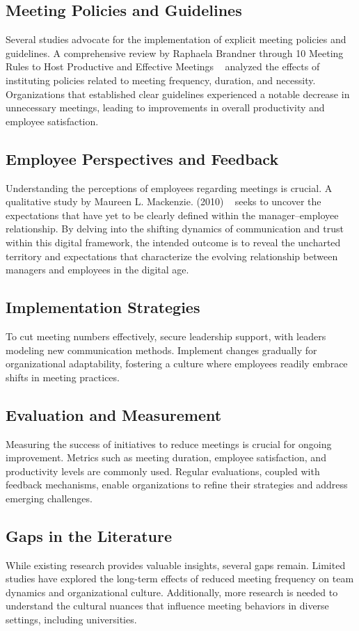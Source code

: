 \subsection{Meeting Policies and Guidelines}
Several studies advocate for the implementation of explicit meeting policies and guidelines. A comprehensive review by Raphaela Brandner through 10 Meeting Rules to Host Productive and Effective Meetings ~\cite{15} analyzed the effects of instituting policies related to meeting frequency, duration, and necessity. Organizations that established clear guidelines experienced a notable decrease in unnecessary meetings, leading to improvements in overall productivity and employee satisfaction.

\subsection{Employee Perspectives and Feedback}
Understanding the perceptions of employees regarding meetings is crucial. A qualitative study by Maureen L. Mackenzie. (2010) ~\cite{16} seeks to uncover the expectations that have yet to be clearly defined within the manager–employee relationship. By delving into the shifting dynamics of communication and trust within this digital framework, the intended outcome is to reveal the uncharted territory and expectations that characterize the evolving relationship between managers and employees in the digital age.

\subsection{Implementation Strategies}
To cut meeting numbers effectively, secure leadership support, with leaders modeling new communication methods. Implement changes gradually for organizational adaptability, fostering a culture where employees readily embrace shifts in meeting practices.

\subsection{Evaluation and Measurement}
Measuring the success of initiatives to reduce meetings is crucial for ongoing improvement. Metrics such as meeting duration, employee satisfaction, and productivity levels are commonly used. Regular evaluations, coupled with feedback mechanisms, enable organizations to refine their strategies and address emerging challenges.

\subsection{Gaps in the Literature}
While existing research provides valuable insights, several gaps remain. Limited studies have explored the long-term effects of reduced meeting frequency on team dynamics and organizational culture. Additionally, more research is needed to understand the cultural nuances that influence meeting behaviors in diverse settings, including universities.
